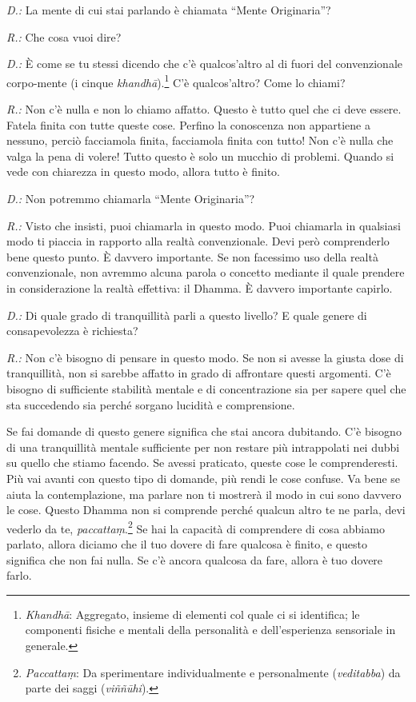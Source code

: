 \emph{D.:} La mente di cui stai parlando è chiamata ``Mente Originaria''?

\emph{R.:} Che cosa vuoi dire?

\emph{D.:} È come se tu stessi dicendo che c'è qualcos'altro al di fuori del
convenzionale corpo-mente (i cinque \emph{khandhā}).\footnote{\emph{Khandhā}:
  Aggregato, insieme di elementi col quale ci si identifica; le
  componenti fisiche e mentali della personalità e dell'esperienza
  sensoriale in generale.} C'è qualcos'altro? Come lo chiami?

\emph{R.:} Non c'è nulla e non lo chiamo affatto. Questo è tutto quel che ci
deve essere. Fatela finita con tutte queste cose. Perfino la conoscenza
non appartiene a nessuno, perciò facciamola finita, facciamola finita
con tutto! Non c'è nulla che valga la pena di volere! Tutto questo è
solo un mucchio di problemi. Quando si vede con chiarezza in questo
modo, allora tutto è finito.

\emph{D.:} Non potremmo chiamarla ``Mente Originaria''?

\emph{R.:} Visto che insisti, puoi chiamarla in questo modo. Puoi chiamarla in
qualsiasi modo ti piaccia in rapporto alla realtà convenzionale. Devi
però comprenderlo bene questo punto. È davvero importante. Se non
facessimo uso della realtà convenzionale, non avremmo alcuna parola o
concetto mediante il quale prendere in considerazione la realtà
effettiva: il Dhamma. È davvero importante capirlo.

\emph{D.:} Di quale grado di tranquillità parli a questo livello? E quale
genere di consapevolezza è richiesta?

\emph{R.:} Non c'è bisogno di pensare in questo modo. Se non si avesse la
giusta dose di tranquillità, non si sarebbe affatto in grado di
affrontare questi argomenti. C'è bisogno di sufficiente stabilità
mentale e di concentrazione sia per sapere quel che sta succedendo sia
perché sorgano lucidità e comprensione.

Se fai domande di questo genere significa che stai ancora dubitando. C'è
bisogno di una tranquillità mentale sufficiente per non restare più
intrappolati nei dubbi su quello che stiamo facendo. Se avessi
praticato, queste cose le comprenderesti. Più vai avanti con questo tipo
di domande, più rendi le cose confuse. Va bene se aiuta la
contemplazione, ma parlare non ti mostrerà il modo in cui sono davvero
le cose. Questo Dhamma non si comprende perché qualcun altro te ne
parla, devi vederlo da te, \emph{paccattaṃ}.\footnote{\emph{Paccattaṃ}:
  Da sperimentare individualmente e personalmente (\emph{veditabba}) da
  parte dei saggi (\emph{viññūhi}).} Se hai la capacità di comprendere
di cosa abbiamo parlato, allora diciamo che il tuo dovere di fare
qualcosa è finito, e questo significa che non fai nulla. Se c'è ancora
qualcosa da fare, allora è tuo dovere farlo.


